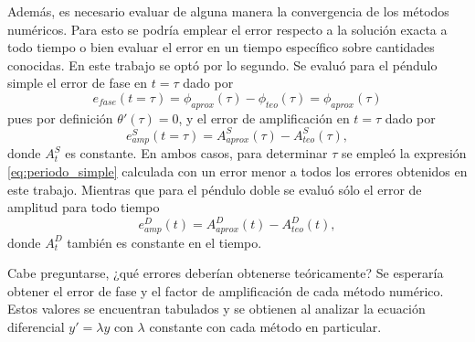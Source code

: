 \documentclass[aps,prb,twocolumn,superscriptaddress,floatfix,longbibliography]{revtex4-2}
\newcounter{para}
\begin{document}
Además, es necesario evaluar de alguna manera la convergencia de los métodos numéricos. Para esto se podría emplear el error respecto a la solución exacta a todo tiempo o bien evaluar el error en un tiempo específico sobre cantidades conocidas. En este trabajo se optó por lo segundo. Se evaluó para el péndulo simple el error de fase en $t = \tau$ dado por
\begin{equation}
  e_{fase}(t = \tau) = \phi_{aprox}(\tau) - \phi_{teo}(\tau) = \phi_{aprox}(\tau)
  \label{eq:simple_e_fase}
\end{equation}
pues por definición $\theta'(\tau) = 0$, y el error de amplificación en $t = \tau$ dado por
\begin{equation}
  e^S_{amp}(t = \tau) = A^S_{aprox}(\tau) - A^S_{teo}(\tau),
  \label{eq:simple_e_amp}
\end{equation}
donde $A^S_{t}$ es constante. En ambos casos, para determinar $\tau$ se empleó la expresión \ref{eq:periodo_simple} calculada con un error menor a todos los errores obtenidos en este trabajo. Mientras que para el péndulo doble se evaluó sólo el error de amplitud para todo tiempo
\begin{equation}
  e^D_{amp}(t) = A^D_{aprox}(t) - A^D_{teo}(t),
  \label{eq:doble_e_amp}
\end{equation}
donde $A^D_{t}$ también es constante en el tiempo.

Cabe preguntarse, ¿qué errores deberían obtenerse teóricamente? Se esperaría obtener el error de fase y el factor de amplificación de cada método numérico. Estos valores se encuentran tabulados y se obtienen al analizar la ecuación diferencial $y' = \lambda y$ con $\lambda$ constante con cada método en particular.
\end{document}
